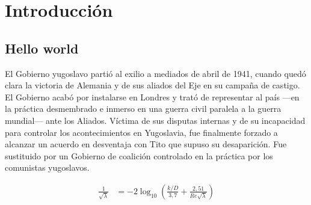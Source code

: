 \chapter{Introducción}
\label{ch:intro}
\section{Hello world}
El Gobierno yugoslavo partió al exilio a mediados de abril de 1941, cuando quedó clara la victoria de Alemania y de sus aliados del Eje en su campaña de castigo. 
El Gobierno acabó por instalarse en Londres y trató de representar al país —en la práctica desmembrado e inmerso en una guerra civil paralela a la guerra mundial— ante los Aliados. 
Víctima de sus disputas internas y de su incapacidad para controlar los acontecimientos en Yugoslavia, fue finalmente forzado a alcanzar un acuerdo en desventaja con Tito que supuso su desaparición. 
Fue sustituido por un Gobierno de coalición controlado en la práctica por los comunistas yugoslavos.

\begin{align}
	\frac{1}{\sqrt{\lambda}} &= -2 \log_{10} {\left ( \frac{k/D}{3,7} + \frac{2,51}{Re \sqrt{\lambda}} \right )}
\end{align}